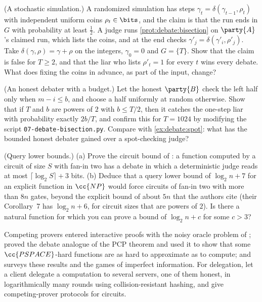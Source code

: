 \begin{refsection}
\begin{exercises}
\item \attack (A stochastic simulation.) A randomized simulation has steps $\gamma_t=\delta(\gamma_{t-1},\rho_t)$ with independent uniform coins $\rho_t\in\bits$, and the claim is that the run ends in $G$ with probability at least $\frac12$. A judge runs \cref{prot:debate:bisection} on $\party{A}$'s claimed run, which lists the coins, and at the end checks $\gamma'_j=\delta(\gamma'_i,\rho'_j)$. Take $\delta(\gamma,\rho)=\gamma+\rho$ on the integers, $\gamma_0=0$ and $G=\{T\}$. Show that the claim is false for $T\ge2$, and that the liar who lists $\rho'_t=1$ for every $t$ wins every debate. What does fixing the coins in advance, as part of the input, change?\label{ex:debate:stochastic}

\item \simulation (An honest debater with a budget.) Let the honest $\party{B}$ check the left half only when $m-i\le b$, and choose a half uniformly at random otherwise. Show that if $T$ and $b$ are powers of $2$ with $b\le T/2$, then it catches the one-step liar with probability exactly $2b/T$, and confirm this for $T=1024$ by modifying the script \texttt{07-debate-bisection.py}. Compare with \cref{ex:debate:spot}: what has the bounded honest debater gained over a spot-checking judge?\label{ex:debate:budget}

\item \research (Query lower bounds.) (a) Prove the circuit bound of \textcite{BrownCohenEtAl2026Query}: a function computed by a circuit of size $S$ with fan-in two has a debate in which a deterministic judge reads at most $\lceil\log_2S\rceil+3$ bits.  (b) Deduce that a query lower bound of $\log_2n+7$ for an explicit function in $\cc{NP}$ would force circuits of fan-in two with more than $8n$ gates, beyond the explicit bound of about $5n$ that the authors cite (their Corollary~7 has $\log_2n+6$, for circuit sizes that are powers of $2$). Is there a natural function for which you can prove a bound of $\log_2n+c$ for some $c>3$?\label{ex:debate:query}
\end{exercises}

\notesandrefs
Competing provers entered interactive proofs with the noisy oracle problem of \textcite{FeigeShamirTennenholtz1988}; \textcite{CondonEtAl1995} proved the debate analogue of the PCP theorem and used it to show that some $\cc{PSPACE}$-hard functions are as hard to approximate as to compute; and \textcite{Feigenbaum1998} surveys these results and the games of imperfect information. For delegation, \textcite{CanettiRivaRothblum2011} let a client delegate a computation to several servers, one of them honest, in logarithmically many rounds using collision-resistant hashing, and \textcite{KolRaz2014} give competing-prover protocols for circuits.


\end{refsection}
